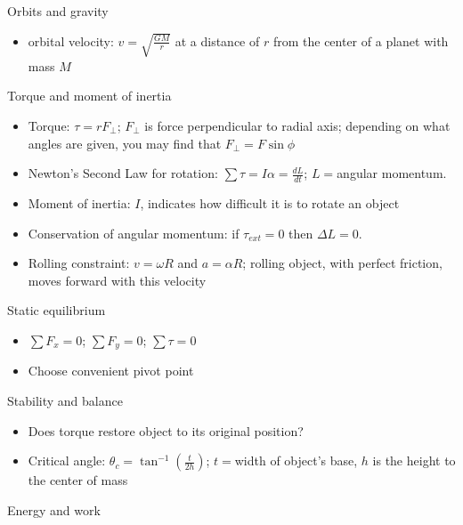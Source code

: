 \documentclass[11pt,letterpaper]{article}
\begin{document}
Orbits and gravity
\begin{itemize}
\item orbital velocity: $v=\displaystyle\sqrt{\displaystyle\frac{GM}{r}}$ at a distance of $r$ from the center of a planet with mass $M$
\end{itemize}
Torque and moment of inertia
\begin{itemize}
\item Torque: $\tau=rF_\perp$; $F_\perp$ is force perpendicular to radial axis; depending on what angles are given, you may find that $F_\perp=F\sin\phi$
\item Newton's Second Law for rotation: $\sum\tau=I\alpha=\displaystyle\frac{dL}{dt}$; $L=$angular momentum.
\item Moment of inertia: $I$, indicates how difficult it is to rotate an object
\item Conservation of angular momentum: if $\tau_{ext}=0$ then $\Delta{L}=0$.
\item Rolling constraint: $v=\omega{R}$ and $a=\alpha{R}$; rolling object, with perfect friction, moves forward with this velocity
\end{itemize}
Static equilibrium
\begin{itemize}
\item $\sum{F_x}=0$; $\sum{F_y}=0$; $\sum\tau=0$
\item Choose convenient pivot point
\end{itemize}
Stability and balance
\begin{itemize}
\item Does torque restore object to its original position?
\item Critical angle: $\theta_c=\tan^{-1}\left(\displaystyle\frac{t}{2h}\right)$; $t=$width of object's base, $h$ is the height to the center of mass
\end{itemize}
Energy and work
\end{document}
